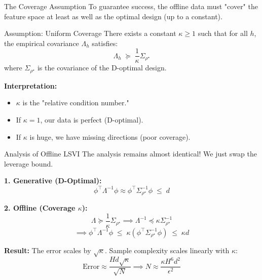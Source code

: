 \documentclass[aspectratio=169]{beamer}
\begin{document}
\begin{frame}{The Coverage Assumption}
    To guarantee success, the offline data must "cover" the feature space at least as well as the optimal design (up to a constant).

    \begin{block}{Assumption: Uniform Coverage}
    There exists a constant $\kappa \ge 1$ such that for all $h$, the empirical covariance $\Lambda_h$ satisfies:
    \[
    \Lambda_h \;\succeq\; \frac{1}{\kappa} \Sigma_{\rho^\star}
    \]
    where $\Sigma_{\rho^\star}$ is the covariance of the D-optimal design.
    \end{block}

    \vspace{0.3cm}
    \textbf{Interpretation:}
    \begin{itemize}
        \item $\kappa$ is the "relative condition number."
        \item If $\kappa=1$, our data is perfect (D-optimal).
        \item If $\kappa$ is huge, we have missing directions (poor coverage).
    \end{itemize}
\end{frame}

\begin{frame}{Analysis of Offline LSVI}
    The analysis remains almost identical! We just swap the leverage bound.

    \vspace{0.3cm}

   \textbf{1. Generative (D-Optimal):}
    \[
    \phi^\top \Lambda^{-1} \phi \approx \phi^\top \Sigma_{\rho^\star}^{-1} \phi \;\le\; d
    \]

   \textbf{2. Offline (Coverage $\kappa$):}
    \[
    \Lambda \succeq \frac{1}{\kappa} \Sigma_{\rho^\star} \implies \Lambda^{-1} \preceq \kappa \Sigma_{\rho^\star}^{-1}
    \]
    \[
    \implies \phi^\top \Lambda^{-1} \phi \;\le\; \kappa \left( \phi^\top \Sigma_{\rho^\star}^{-1} \phi \right) \;\le\; \kappa d
    \]

    \vspace{0.3cm}
   \textbf{Result:}
    The error scales by $\sqrt{\kappa}$. Sample complexity scales linearly with $\kappa$:
    \[
    \text{Error} \approx \frac{H d \sqrt{\kappa}}{\sqrt{N}} \implies N \approx \frac{\kappa H^6 d^2}{\epsilon^2}
    \]
\end{frame}


\end{document}

